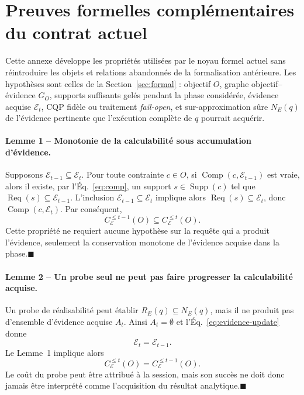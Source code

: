 \section{Preuves formelles complémentaires du contrat actuel}
\label{app:formal-proofs-post-a8}

Cette annexe développe les propriétés utilisées par le noyau formel actuel sans réintroduire les objets et relations abandonnés de la formalisation antérieure. Les hypothèses sont celles de la Section~\ref{sec:formal} : objectif $O$, graphe objectif--évidence $G_O$, supports suffisants gelés pendant la phase considérée, évidence acquise $\mathcal{E}_t$, CQP fidèle ou traitement \emph{fail-open}, et sur-approximation sûre $N_E(q)$ de l'évidence pertinente que l'exécution complète de $q$ pourrait acquérir.

\paragraph*{Lemme 1 -- Monotonie de la calculabilité sous accumulation d'évidence.}
Supposons $\mathcal{E}_{t-1}\subseteq\mathcal{E}_t$. Pour toute contrainte $c\in O$, si $\operatorname{Comp}(c,\mathcal{E}_{t-1})$ est vraie, alors il existe, par l'Éq.~\eqref{eq:comp}, un support $s\in\operatorname{Supp}(c)$ tel que $\operatorname{Req}(s)\subseteq\mathcal{E}_{t-1}$. L'inclusion $\mathcal{E}_{t-1}\subseteq\mathcal{E}_t$ implique alors $\operatorname{Req}(s)\subseteq\mathcal{E}_t$, donc $\operatorname{Comp}(c,\mathcal{E}_t)$. Par conséquent,
\[
C_{\mathcal{E}}^{\le t-1}(O)\subseteq C_{\mathcal{E}}^{\le t}(O).
\]
Cette propriété ne requiert aucune hypothèse sur la requête qui a produit l'évidence, seulement la conservation monotone de l'évidence acquise dans la phase.\unskip\nobreak\hspace{0.5em}$\blacksquare$

\paragraph*{Lemme 2 -- Un probe seul ne peut pas faire progresser la calculabilité acquise.}
Un probe de réalisabilité peut établir $R_E(q)\subseteq N_E(q)$, mais il ne produit pas d'ensemble d'évidence acquise $A_t$. Ainsi $A_t=\emptyset$ et l'Éq.~\eqref{eq:evidence-update} donne
\[
\mathcal{E}_t=\mathcal{E}_{t-1}.
\]
Le Lemme~1 implique alors
\[
C_{\mathcal{E}}^{\le t}(O)=C_{\mathcal{E}}^{\le t-1}(O).
\]
Le coût du probe peut être attribué à la session, mais son succès ne doit donc jamais être interprété comme l'acquisition du résultat analytique.\unskip\nobreak\hspace{0.5em}$\blacksquare$

